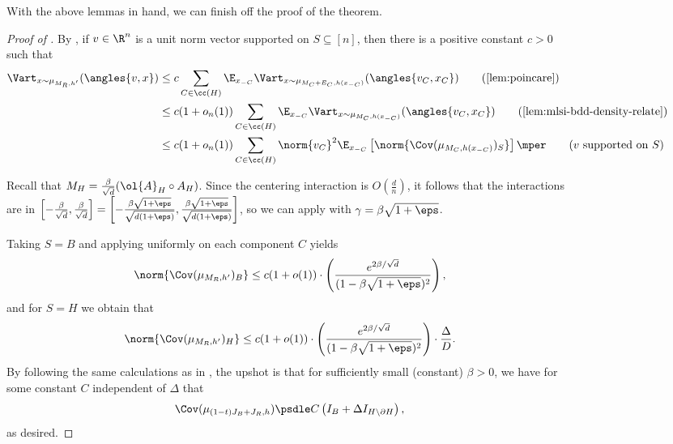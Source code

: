\documentclass[11pt,letterpaper]{article}
\begin{document}
\begin{figure}
\begin{figure}
With the above lemmas in hand, we can finish off the proof of the theorem.
\begin{proof}[Proof of ]
    By , if $v \in \R^n$ is a unit norm vector supported on $S \subseteq [n]$, then there is a positive constant $c > 0$ such that 
    \begin{align*}
        \Vart_{x \sim \mu_{M_R, h'}}(\angles{v, x}) &\le c \sum_{C \in \cc(H)} \E_{x_{-C}} \Vart_{x \sim \mu_{M_C + E_C, h(x_{-C})}}(\angles{v_C, x_C}) \tag*{(\text{\Cref{lem:poincare}})}\\
        &\le c(1+o_n(1)) \sum_{C \in \cc(H)} \E_{x_{-C}} \Vart_{x \sim \mu_{M_C, h(x_{-C})}}(\angles{v_C, x_C}) \tag*{(\text{\Cref{lem:mlsi-bdd-density-relate}})} \\
        &\le c(1+o_n(1)) \sum_{C \in \cc(H)} \norm{v_C}^2 \E_{x_{-C}} \left[ \norm{\Cov(\mu_{M_C, h(x_{-C})})_{S}}\right]\mper \tag*{(\text{$v$ supported on $S$})}
    \end{align*}

    Recall that $M_H = \frac{\beta}{\sqrt{d}}(\ol{A}_H \circ A_H)$.
    Since the centering interaction is $O(\frac{d}{n})$, it follows that 
    the interactions are in $\left[ -\frac{\beta}{\sqrt{d}} , \frac{\beta}{\sqrt{d}} \right] = \left[ - \frac{\beta\sqrt{1+\eps}}{\sqrt{d(1+\eps)}} , \frac{\beta\sqrt{1+\eps}}{\sqrt{d(1+\eps)}} \right]$, so we can apply  with $\gamma = \beta\sqrt{1+\eps}$. 
    
    Taking $S = B$ and applying  uniformly on each component $C$ yields
    \begin{align*}
        \norm{\Cov(\mu_{M_R, h'})_B} \le c(1+o(1)) \cdot \left(\frac{e^{2\beta/\sqrt{d}}}{(1-\beta\sqrt{1+\eps})^2}\right),
    \end{align*}
    and for $S = H$ we obtain that 
    \begin{align*}
        \norm{\Cov(\mu_{M_R, h'})_H} \le c(1+o(1)) \cdot \left(\frac{e^{2\beta/\sqrt{d}}}{(1-\beta\sqrt{1+\eps})^2} \right) \cdot \frac{\Delta}{D} .
    \end{align*}
    By following the same calculations as in , the upshot is that for sufficiently small (constant) $\beta > 0$, we have for some constant $C$ independent of $\Delta$ that
    \begin{align*}
        \Cov(\mu_{(1-t)J_B + J_R, h}) \psdle C \left( I_B + \Delta I_{H \setminus \partial H} \right),
    \end{align*}
    as desired.
\end{proof}



\end{figure}
\end{figure}
\end{document}
